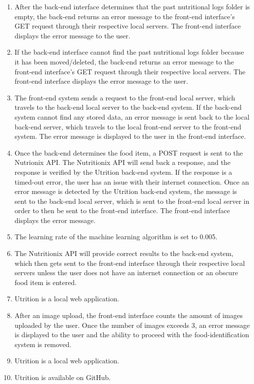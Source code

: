 \documentclass[12pt, titlepage]{article}
\begin{document}
\begin{enumerate}[{PR}1. ]
	\item After the back-end interface determines that the past nutritional logs folder is empty, the back-end returns an error message to the front-end interface's GET request through their respective local servers. The front-end interface displays the error message to the user.
	\item If the back-end interface cannot find the past nutritional logs folder because it has been moved/deleted, the back-end returns an error message to the front-end interface's GET request through their respective local servers. The front-end interface displays the error message to the user.
	\item The front-end system sends a request to the front-end local server, which travels to the back-end local server to the back-end system. If the back-end system cannot find any stored data, an error message is sent back to the local back-end server, which travels to the local front-end server to the front-end system. The error message is displayed to the user in the front-end interface.
	\item Once the back-end determines the food item, a POST request is sent to the Nutrionix API. The Nutritionix API will send back a response, and the response is verified by the Utrition back-end system. If the response is a timed-out error, the user has an issue with their internet connection. Once an error message is detected by the Utrition back-end system, the message is sent to the back-end local server, which is sent to the front-end local server in order to then be sent to the front-end interface. The front-end interface displays the error message.
	\item The learning rate of the machine learning algorithm is set to 0.005.
	\item The Nutritionix API will provide correct results to the back-end system, which then gets sent to the front-end interface through their respective local servers unless the user does not have an internet connection or an obscure food item is entered.
	\item Utrition is a local web application.
	\item After an image upload, the front-end interface counts the amount of images uploaded by the user. Once the number of images exceeds 3, an error message is displayed to the user and the ability to proceed with the food-identification system is removed.
	\item Utrition is a local web application.
	\item Utrition is available on GitHub.
\end{enumerate}
\end{document}

